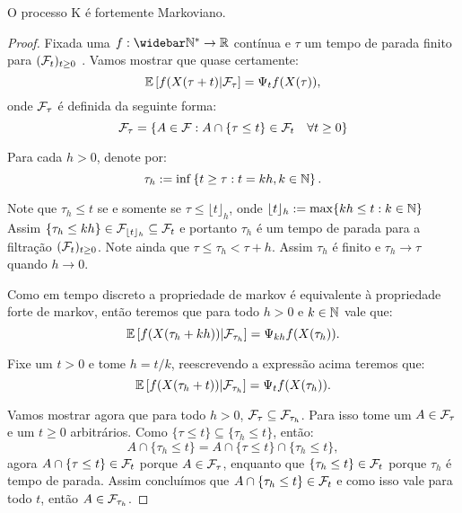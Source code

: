 \begin{proposicao}
  \label{prop:markov-forte}
  O processo K é fortemente Markoviano.
\end{proposicao}
\begin{proof}
  Fixada uma $f: \Nzb \to \R$ contínua e $\tau$ um tempo de parada
  finito para $({\mathcal{F}}_t)_{t \geq 0}$ . Vamos mostrar que quase
  certamente:
  \begin{equation}
    \label{eq:markov-forte}
    {\mathbb{E}} \left[ f(X(\tau + t) \middle| {\mathcal{F}}_\tau \right]
    = \Psi_t f (X(\tau)),
  \end{equation}
  onde ${\mathcal{F}}_\tau$ é definida da seguinte forma:
  \begin{displaymath}
    {\mathcal{F}}_\tau = \left\{
      A \in {\mathcal{F}}:  A \cap \{\tau \leq t\} \in {\mathcal{F}}_t \quad \forall t \geq 0 
    \right\}
  \end{displaymath}


  Para cada $h > 0$, denote por: 
  \begin{displaymath}
    \tau_h := \inf\left\{
      t \geq \tau: t = k h, k \in {\mathbb{N}}
    \right\}.
  \end{displaymath}

  Note que $\tau_h \leq t$ se e somente se $\tau \leq \lfloor t
  \rfloor_h$, onde $\lfloor t \rfloor_h := \max\{k h \leq t: k \in
  {\mathbb{N}}\}$ Assim $\{\tau_h \leq k h\} \in {\mathcal{F}}_{\lfloor t \rfloor_h}
  \subseteq {\mathcal{F}}_t$ e portanto $\tau_h$ é um tempo de parada para a
  filtração $({\mathcal{F}}_{t})_{t \geq 0}$. Note ainda que $\tau \leq \tau_h
  < \tau + h$. Assim $\tau_h$ é \qc finito e $\tau_h \to \tau$ \qc
  quando $h \to 0$.

  Como em tempo discreto a propriedade de markov é equivalente à
  propriedade forte de markov, então teremos que para todo $h > 0$ e
  $k \in {\mathbb{N}}$ vale que:
 \begin{displaymath}
    {\mathbb{E}} \left[ f(X(\tau_h + k h)) \middle| {\mathcal{F}}_{\tau_h} \right]
    = \Psi_{k h} f (X(\tau_h)).
  \end{displaymath}
  
  Fixe um $t > 0$ e tome $h = t/k$, reescrevendo a expressão acima
  teremos que:
  \begin{displaymath}
    \label{eq:markov-forte-esp-cond}
    {\mathbb{E}} \left[ f(X(\tau_h + t)) \middle| {\mathcal{F}}_{\tau_h} \right]
    = \Psi_t f (X(\tau_h)).
  \end{displaymath}


  Vamos mostrar agora que para todo $h > 0$, ${\mathcal{F}}_{\tau} \subseteq
  {\mathcal{F}}_{\tau_h}$. Para isso tome um $A \in {\mathcal{F}}_\tau$ e um $t \geq 0$
  arbitrários. Como $\{\tau \leq t\} \subseteq \{\tau_h \leq t\}$,
  então:
  \begin{displaymath}
    A \cap \{ \tau_h \leq t \} =
    A \cap \{ \tau \leq t \} \cap \{ \tau_h \leq t \},
  \end{displaymath}
  agora $A \cap \{ \tau \leq t \} \in {\mathcal{F}}_t$ porque $A \in {\mathcal{F}}_\tau$,
  enquanto que $ \{ \tau_h \leq t \} \in {\mathcal{F}}_t$ porque $\tau_h$ é
  tempo de parada. Assim concluímos que $A \cap \{ \tau_h \leq t \}
  \in {\mathcal{F}}_t$ e como isso vale para todo $t$, então $A \in
  {\mathcal{F}}_{\tau_h}$.


\end{proof}
